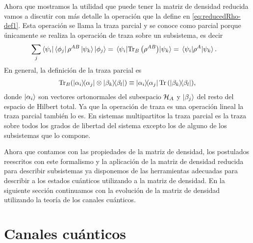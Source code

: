 Ahora que mostramos la utilidad que puede tener la matriz de densidad
reducida vamos a discutir con más detalle la operación que la define en
\eqref{eq:reducedRho-def1}. 
Esta operación se llama la traza parcial y se conoce como parcial 
porque únicamente se realiza la operación de traza sobre un subsistema, 
es decir
\begin{align} 
	\sum _j \bra{\psi_i}\bra{\phi_j}\rho^{AB}\ket{\psi_k}\ket{\phi_j}
	&=\matrixel{\psi_i}{\Tr_B\qty(\rho^{AB})}{\psi_k}
	= \matrixel{\psi_i}{\rho^A}{\psi_k}.
	\label{eq:partialTrace-def}
\end{align}
En general, la definición de la traza parcial es \cite{nielsen_chuang_2011}
\begin{align}
	\Tr_B (\dyad{\alpha_i}{\alpha_j}\otimes \dyad{\beta_k}{\beta_l})
	\equiv
	\dyad{\alpha_i}{\alpha_j}\Tr \qty(\dyad{\beta_k}{\beta_l}),
	\label{eq:part_trace-def}
\end{align}
donde $\ket{\alpha_i}$ son vectores ortonormales del subespacio $\mathcal{H}_A$
y $\ket{\beta_j}$ del resto del espacio de Hilbert total. Ya que la operación
de traza es una operación lineal la traza parcial también lo es.   
En sistemas 
multipartitos la traza parcial es la traza sobre 
todos los grados de libertad del sistema excepto los de alguno de los 
subsistemas que lo compone.

Ahora que contamos con las propiedades de la matriz de densidad, 
los postulados reescritos con este formalismo y la aplicación de la matriz
de densidad reducida para describir subsistemas ya disponemos de
las herramientas adecuadas para describir a los estados cuánticos 
utilizando a la matriz de densidad. En la siguiente sección continuamos 
con la evolución de la matriz de densidad utilizando la teoría de los 
canales cuánticos.

\section{Canales cuánticos}\label{sec:qtm-channels} %

